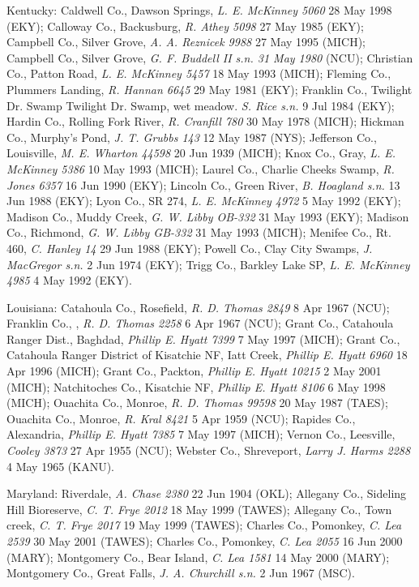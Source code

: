 \documentclass{article}
\begin{document}
Kentucky:
Caldwell Co., Dawson Springs, \textit{L. E. McKinney 5060} 28 May 1998 (EKY);
Calloway Co., Backusburg, \textit{R. Athey 5098} 27 May 1985 (EKY);
Campbell Co., Silver Grove, \textit{A. A. Reznicek 9988} 27 May 1995 (MICH);
Campbell Co., Silver Grove, \textit{G. F. Buddell II s.n. 31 May 1980} (NCU);
Christian Co., Patton Road, \textit{L. E. McKinney 5457} 18 May 1993 (MICH);
Fleming Co., Plummers Landing, \textit{R. Hannan 6645} 29 May 1981 (EKY);
Franklin Co., Twilight Dr. Swamp	Twilight Dr. Swamp, wet meadow.	\textit{S. Rice s.n.} 9 Jul 1984 (EKY);
Hardin Co., Rolling Fork River, \textit{R. Cranfill 780} 30 May 1978 (MICH);
Hickman Co., Murphy's Pond, \textit{J. T. Grubbs 143} 12 May 1987 (NYS);
Jefferson Co., Louisville, \textit{M. E. Wharton 44598} 20 Jun 1939 (MICH);
Knox Co., Gray, \textit{L. E. McKinney 5386} 10 May 1993 (MICH);
Laurel Co., Charlie Cheeks Swamp, \textit{R. Jones 6357} 16 Jun 1990 (EKY);
Lincoln Co., Green River, \textit{B. Hoagland s.n.} 13 Jun 1988 (EKY);
Lyon Co., SR 274, \textit{L. E. McKinney 4972} 5 May 1992 (EKY);
Madison Co., Muddy Creek, \textit{G. W. Libby OB-332} 31 May 1993 (EKY);
Madison Co., Richmond, \textit{G. W. Libby GB-332} 31 May 1993 (MICH);
Menifee Co., Rt. 460, \textit{C. Hanley 14} 29 Jun 1988 (EKY);
Powell Co., Clay City Swamps, \textit{J. MacGregor s.n.} 2 Jun 1974 (EKY);
Trigg Co., Barkley Lake SP, \textit{L. E. McKinney 4985} 4 May 1992 (EKY).

Louisiana:
Catahoula Co., Rosefield, \textit{R. D. Thomas 2849} 8 Apr 1967 (NCU);
Franklin Co., , \textit{R. D. Thomas 2258} 6 Apr 1967 (NCU);
Grant Co., Catahoula Ranger Dist., Baghdad, \textit{Phillip E. Hyatt 7399} 7 May 1997 (MICH);
Grant Co., Catahoula Ranger District of Kisatchie NF, Iatt Creek, \textit{Phillip E. Hyatt 6960} 18 Apr 1996 (MICH);
Grant Co., Packton, \textit{Phillip E. Hyatt 10215} 2 May 2001 (MICH);
Natchitoches Co., Kisatchie NF, \textit{Phillip E. Hyatt 8106} 6 May 1998 (MICH);
Ouachita Co., Monroe, \textit{R. D. Thomas 99598} 20 May 1987 (TAES);
Ouachita Co., Monroe, \textit{R. Kral 8421} 5 Apr 1959 (NCU);
Rapides Co., Alexandria, \textit{Phillip E. Hyatt 7385} 7 May 1997 (MICH);
Vernon Co., Leesville, \textit{Cooley 3873} 27 Apr 1955 (NCU);
Webster Co., Shreveport, \textit{Larry J. Harms 2288} 4 May 1965 (KANU).

Maryland:
Riverdale, \textit{A. Chase 2380} 22 Jun 1904 (OKL);
Allegany Co., Sideling Hill Bioreserve, \textit{C. T. Frye 2012} 18 May 1999 (TAWES);
Allegany Co., Town creek, \textit{C. T. Frye 2017} 19 May 1999 (TAWES);
Charles Co., Pomonkey, \textit{C. Lea 2539} 30 May 2001 (TAWES);
Charles Co., Pomonkey, \textit{C. Lea 2055} 16 Jun 2000 (MARY);
Montgomery Co., Bear Island, \textit{C. Lea 1581} 14 May 2000 (MARY);
Montgomery Co., Great Falls, \textit{J. A. Churchill s.n.} 2 Jun 1967 (MSC).
\end{document}
